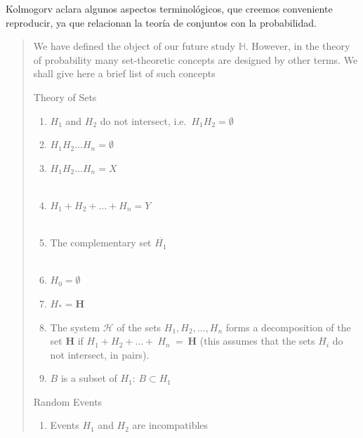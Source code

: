 \documentclass[a4paper,11pt]{book}
\theoremstyle{definition}
\begin{document}
Kolmogorv aclara algunos aspectos terminol\'ogicos, que creemos conveniente reproducir, ya que relacionan la teor\'ia de conjuntos con la probabilidad.
%
\begin{quotation}
  We have defined the object of our future study $\mathbb{H}$.
  However, in the theory of probability many set-theoretic concepts are designed by other terms.
  We shall give here a brief list of such concepts \\[0.2cm]
  \begin{paracol}{2}

  Theory of Sets

  \begin{enumerate}
    \item $H_1$ and $H_2$ do not intersect, i.e.~$H_1H_2 = \emptyset$

    \item $H_1H_2\dots H_n = \emptyset$ \\

    \item $H_1H_2\dots H_n = X$ \\ \\

    \item $H_1 + H_2 + \dots + H_n = Y$ \\ \\

    \item The complementary set $\overline{H_1}$ \\ \\

    \item $H_0 = \emptyset$

    \item $H_{*} = \textbf{H}$

    \item The system $\mathcal{H}$ of the sets $H_1, H_2, \dots, H_n $ forms a decomposition of the set $\textbf{H}$ if $H_1 + H_2 + \dots +~H_n~=~\textbf{H}$
    (this assumes that the sets $H_i$ do not intersect, in pairs). \\

    \item $B$ is a subset of $H_1$: $B \subset H_1$
  \end{enumerate}

  \switchcolumn

  Random Events

  \begin{enumerate}
    \item Events $H_1$ and $H_2$ are incompatibles


\end{enumerate}
\end{paracol}
\end{quotation}
\end{document}
